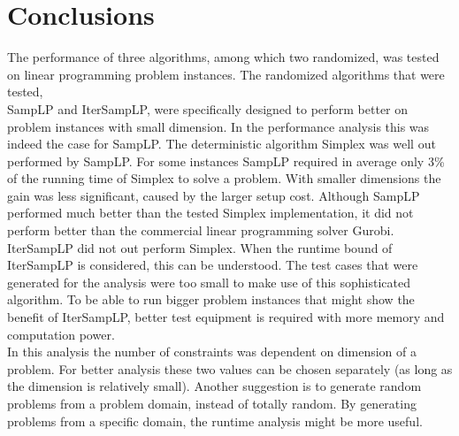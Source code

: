 \documentclass[nocopyrightspace]{acm_proc_article-sp}
\begin{document}
\section{Conclusions}
The performance of three algorithms, among which two randomized, was tested on linear programming problem instances. The randomized algorithms that were tested,\\ SampLP and IterSampLP, were specifically designed to perform better on problem instances with small dimension. In the performance analysis this was indeed the case for SampLP. The deterministic algorithm Simplex was well out performed by SampLP. For some instances SampLP required in average only 3\% of the running time of Simplex to solve a problem. With smaller dimensions the gain was less significant, caused by the larger setup cost. Although SampLP performed much better than the tested Simplex implementation, it did not perform better than the commercial linear programming solver Gurobi. \\
IterSampLP did not out perform Simplex. When the runtime bound of IterSampLP is considered, this can be understood. The test cases that were generated for the analysis were too small to make use of this sophisticated algorithm. To be able to run bigger problem instances that might show the benefit of IterSampLP, better test equipment is required with more memory and computation power. \\
In this analysis the number of constraints was dependent on dimension of a problem. For better analysis these two values can be chosen separately (as long as the dimension is relatively small). Another suggestion is to generate random problems from a problem domain, instead of totally random. By generating problems from a specific domain, the runtime analysis might be more useful.


\balancecolumns
\end{document}
